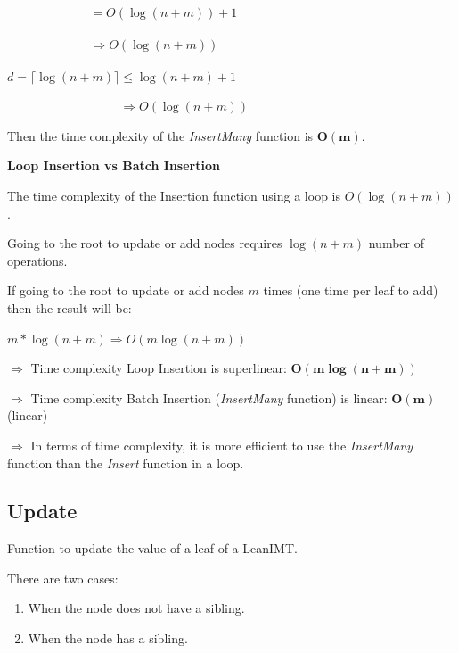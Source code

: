 \documentclass{article}
\begin{document}
$\phantom{\sum_{k=0}^{d} 1 = \frac{a}{1-r}} = O(\log (n+m)) + 1$



$\phantom{\sum_{k=0}^{d} 1 = \frac{a}{1-r}} \Rightarrow O(\log (n+m))$



$d = \lceil \log (n+m) \rceil \leq \log (n+m) + 1$



$\phantom{d = \lceil \log (n + m) \rceil} \Rightarrow O(\log (n+m))$

Then the time complexity of the \textit{InsertMany} function is $\boldsymbol{O(m)}$.



\textbf{Loop Insertion vs Batch Insertion}



The time complexity of the Insertion function using a loop is $O(\log (n+m))$.



Going to the root to update or add nodes requires $ \log (n+m)$ number of operations.

If going to the root to update or add nodes $m$ times (one time per leaf to add) then the result will be:



$m * \log (n+m) \Rightarrow \boxed{O(m \log (n+m))}$



$\Rightarrow$ Time complexity Loop Insertion is superlinear: $\boldsymbol{O(m \log (n+m))}$



$\Rightarrow$ Time complexity Batch Insertion (\textit{InsertMany} function) is linear: $\boldsymbol{O(m)}$ (linear)



$\Rightarrow$ In terms of time complexity, it is more efficient to use the \textit{InsertMany} function than the \textit{Insert} function in a loop.



\subsection{Update}

Function to update the value of a leaf of a LeanIMT.

There are two cases:

\begin{enumerate}
    \item When the node does not have a sibling.
    \item When the node has a sibling.
\end{enumerate}
\end{document}

